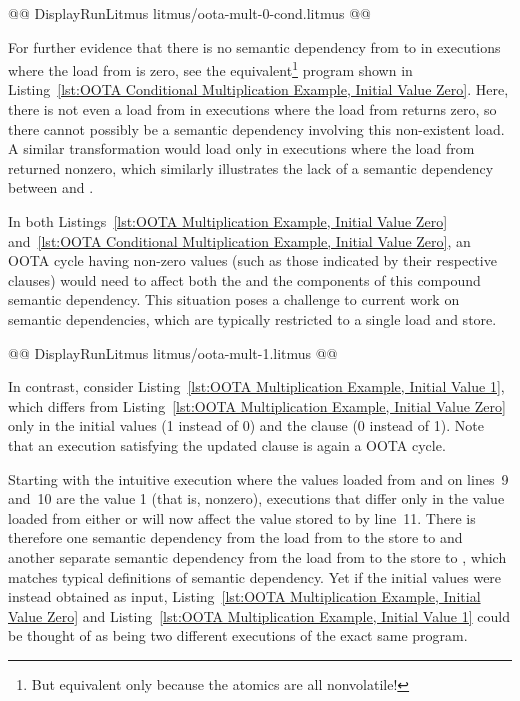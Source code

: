 \documentclass[10]{article}
\begin{document}
\begin{listing}[tbp]
@@ DisplayRunLitmus litmus/oota-mult-0-cond.litmus @@
\caption{OOTA Conditional Multiplication Example, Initial Value Zero}
\label{lst:OOTA Conditional Multiplication Example, Initial Value Zero}
\end{listing}

For further evidence that there is no semantic dependency from 
to  in executions where the load from  is zero, see the
equivalent\footnote{
	But equivalent only because the atomics are all nonvolatile!}
program shown in
Listing~\ref{lst:OOTA Conditional Multiplication Example, Initial Value Zero}.
Here, there is not even a load from  in executions where the
load from  returns zero, so there cannot possibly be a semantic
dependency involving this non-existent load.
A similar transformation would load  only in executions where the
load from  returned nonzero, which similarly illustrates the lack
of a semantic dependency between  and .

In both
Listings~\ref{lst:OOTA Multiplication Example, Initial Value Zero}
and~\ref{lst:OOTA Conditional Multiplication Example, Initial Value Zero},
an OOTA cycle having non-zero values (such as those indicated by their
respective  clauses) would need to affect both the 
and the  components of this compound semantic dependency.
This situation poses a challenge to current work on semantic dependencies,
which are typically restricted to a single load and store.

\begin{listing}[tbp]
@@ DisplayRunLitmus litmus/oota-mult-1.litmus @@
\caption{OOTA Multiplication Example, Initial Value 1}
\label{lst:OOTA Multiplication Example, Initial Value 1}
\end{listing}

In contrast, consider
Listing~\ref{lst:OOTA Multiplication Example, Initial Value 1},
which differs from
Listing~\ref{lst:OOTA Multiplication Example, Initial Value Zero}
only in the initial values (1 instead of 0) and the 
clause (0 instead of 1).
Note that an execution satisfying the updated  clause is again
a OOTA cycle.

Starting with the intuitive execution where the values loaded from 
and  on lines~9 and~10 are the value 1 (that is, nonzero), executions
that differ only in the value loaded from either  or  will
now affect the value stored to  by line~11.
There is therefore one semantic dependency from the load from 
to the store to  and another separate semantic dependency from
the load from  to the store to , which matches typical
definitions of semantic dependency.
Yet if the initial values were instead obtained as input,
Listing~\ref{lst:OOTA Multiplication Example, Initial Value Zero}
and
Listing~\ref{lst:OOTA Multiplication Example, Initial Value 1}
could be thought of as being two different executions of the exact same
program.
\end{document}
